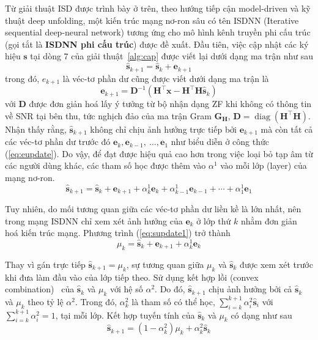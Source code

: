 Từ giải thuật ISD được trình bày ở trên, theo hướng tiếp cận model-driven và kỹ thuật deep unfolding, một kiến trúc mạng nơ-ron sâu có tên ISDNN (Iterative sequential deep-neural network) tương ứng cho mô hình kênh truyền phi cấu trúc (gọi tắt là \textbf{ISDNN phi cấu trúc}) được đề xuất. Đầu tiên, việc cập nhật các ký hiệu $\mathbf{s}$ tại dòng $7$ của giải thuật~\ref{alg:cap} được viết lại dưới dạng ma trận như sau
\begin{equation}
\hat{\mathbf{s}}_{k+1}=\hat{\mathbf{s}}_k+\mathbf{e}_{k+1}
\end{equation}
trong đó, $e_{k+1}$ là véc-tơ phần dư cũng được viết dưới dạng ma trận là
\begin{equation}
    \mathbf{e}_{k+1}=\mathbf{D}^{-1}\left(\mathbf{H}^\top \mathbf{x}-\mathbf{H}^\top \mathbf{H} \hat{\mathbf{s}}_k\right)
\end{equation}
với $\mathbf{D}$ được đơn giản hoá lấy ý tưởng từ bộ nhận dạng ZF khi không có thông tin về SNR tại bên thu, tức nghịch đảo của ma trận Gram $\mathbf{G}_\mathbf{H}$, $\mathbf{D} = \operatorname{diag}(\mathbf{H}^\top \mathbf{H})$. 
Nhận thấy rằng, $\hat{\mathbf{s}}_{k+1}$ không chỉ chịu ảnh hưởng trực tiếp bởi $\mathbf{e}_{k+1}$ mà còn tất cả các véc-tơ phần dư trước đó $\mathbf{e}_{k}, \mathbf{e}_{k-1},~\ldots, \mathbf{e}_{1}$ như biểu diễn ở công thức (\ref{eq:eupdate}). Do vậy, để đạt được hiệu quả cao hơn trong việc loại bỏ tạp âm từ các người dùng khác, các tham số học được thêm vào $\alpha^1$ vào mỗi lớp (layer) của mạng nơ-ron.
\begin{equation}
\label{eq:supdate1}
\hat{\mathbf{s}}_{k+1}=\hat{\mathbf{s}}_k+\mathbf{e}_{k+1}+\alpha_k^{1} \mathbf{e}_k+\alpha_{k-1}^{1} \mathbf{e}_{k-1}+\cdots+\alpha_1^{1} \mathbf{e}_1
\end{equation}

Tuy nhiên, do mối tương quan giữa các véc-tơ phần dư liền kề là lớn nhất, nên trong mạng ISDNN chỉ xem xét ảnh hưởng của $\mathbf{e}_k$ ở lớp thứ $k$ nhằm đơn giản hoá kiến trúc mạng. Phương trình (\ref{eq:supdate1}) trở thành 
\begin{equation}
\mu_{k}=\hat{\mathbf{s}}_k+\mathbf{e}_{k+1}+\alpha_k^1 \mathbf{e}_k
\end{equation}

Thay vì gán trực tiếp $\hat{\mathbf{s}}_{k+1} = \mu_k$, sự tương quan giữa $\mu_k$ và $\hat{\mathbf{s}}_k$ được xem xét trước khi đưa làm đầu vào của lớp tiếp theo. Sử dụng kết hợp lồi (convex combination)~\cite{hammad2023} của $\hat{\mathbf{s}}_k$ và $\mu_k$ với hệ số $\alpha^2$. Do đó, $\hat{\mathbf{s}}_{k+1}$ chịu ảnh hưởng bởi cả $\hat{\mathbf{s}}_k$ và $\mu_k$ theo tỷ lệ $\alpha^2$. 
Trong đó, $\alpha^2_k$ là tham số có thể học, $\sum_{i=k}^{k+1} \alpha_i^{2} \hat{\mathbf{s}}_i$ với $\sum_{i=k}^{k+1} \alpha_i^{2}=1$, tại mỗi lớp. Kết hợp tuyến tính của $\hat{\mathbf{s}}_k$ và $\mu_k$ có dạng như sau
\begin{equation}
\hat{\mathbf{s}}_{k+1}=\left(1-\alpha_k^2\right) \mu_k + \alpha_k^2 \hat{\mathbf{s}}_k
\end{equation}

